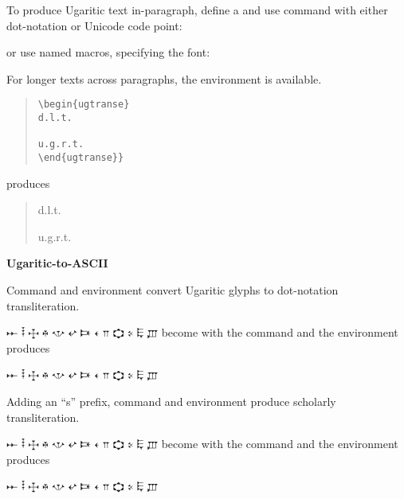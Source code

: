 \documentclass{article}
\begin{document}
To produce Ugaritic text in-paragraph, define a \cs{\ugfont} and use command \cs{\ugtrans} with either dot-notation or Unicode code point:

\begin{quotation}

\end{quotation}
or use named macros, specifying the font:


\begin{quotation}


\end{quotation}

\bigskip
For longer texts across paragraphs, the  environment is available.

\begin{quotation}
\noindent\begin{verbatim}
\begin{ugtranse}
d.l.t.

u.g.r.t.
\end{ugtranse}}
\end{verbatim}
\end{quotation}
produces

\begin{quotation}
\begin{ugtranse}
d.l.t.

u.g.r.t.
\end{ugtranse}
\end{quotation}

\bigskip
\textbf{Ugaritic-to-\textsc{ASCII}}

Command \cs{\ugtransrev} and environment  convert Ugaritic glyphs to dot-notation transliteration.

{\ugfont
𐎀
𐎃
𐎈
𐎉
𐎌
𐎏
𐎑
𐎓
𐎕
𐎘
𐎙
𐎛
𐎜
}
become 
with the command
and the environment produces
\begin{ugtranserev}
𐎀
𐎃
𐎈
𐎉
𐎌
𐎏
𐎑
𐎓
𐎕
𐎘
𐎙
𐎛
𐎜
\end{ugtranserev}

\bigskip
Adding an ``s'' prefix, command \cs{\sugtransrev} and environment  produce scholarly transliteration.

{\ugfont
𐎀
𐎃
𐎈
𐎉
𐎌
𐎏
𐎑
𐎓
𐎕
𐎘
𐎙
𐎛
𐎜
}
become 
with the command
and the environment produces
\begin{sugtranserev}
𐎀
𐎃
𐎈
𐎉
𐎌
𐎏
𐎑
𐎓
𐎕
𐎘
𐎙
𐎛
𐎜
\end{sugtranserev}
\end{document}
